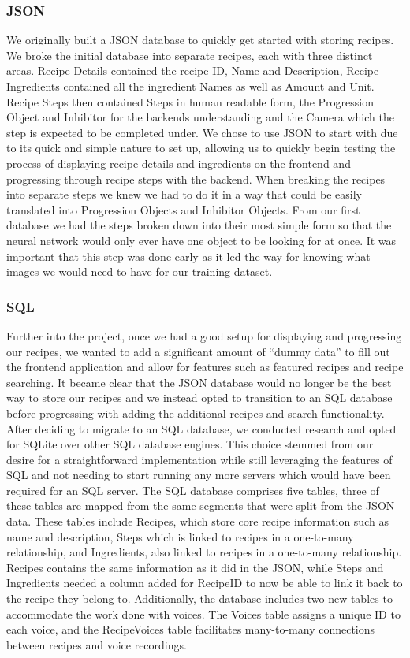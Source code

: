 \documentclass{article}
\begin{document}
    \subsubsection{JSON}
    We originally built a JSON database to quickly get started with storing recipes. We broke the initial database into separate recipes, each with three distinct areas. Recipe Details contained the recipe ID, Name and Description, Recipe Ingredients contained all the ingredient Names as well as Amount and Unit. Recipe Steps then contained Steps in human readable form, the Progression Object and Inhibitor for the backends understanding and the Camera which the step is expected to be completed under.
    We chose to use JSON to start with due to its quick and simple nature to set up, allowing us to quickly begin testing the process of displaying recipe details and ingredients on the frontend and progressing through recipe steps with the backend.
    When breaking the recipes into separate steps we knew we had to do it in a way that could be easily translated into Progression Objects and Inhibitor Objects. From our first database we had the steps broken down into their most simple form so that the neural network would only ever have one object to be looking for at once. It was important that this step was done early as it led the way for knowing what images we would need to have for our training dataset.
    \subsubsection{SQL}
    Further into the project, once we had a good setup for displaying and progressing our recipes, we wanted to add a significant amount of “dummy data” to fill out the frontend application and allow for features such as featured recipes and recipe searching. It became clear that the JSON database would no longer be the best way to store our recipes and we instead opted to transition to an SQL database before progressing with adding the additional recipes and search functionality.
    After deciding to migrate to an SQL database, we conducted research and opted for SQLite over other SQL database engines. This choice stemmed from our desire for a straightforward implementation while still leveraging the features of SQL and not needing to start running any more servers which would have been required for an SQL server.
    The SQL database comprises five tables, three of these tables are mapped from the same segments that were split from the JSON data. These tables include Recipes, which store core recipe information such as name and description, Steps which is linked to recipes in a one-to-many relationship, and Ingredients, also linked to recipes in a one-to-many relationship. Recipes contains the same information as it did in the JSON, while Steps and Ingredients needed a column added for RecipeID to now be able to link it back to the recipe they belong to.
    Additionally, the database includes two new tables to accommodate the work done with voices. The Voices table assigns a unique ID to each voice, and the Recipe\textunderscore Voices table facilitates many-to-many connections between recipes and voice recordings.
\end{document}
